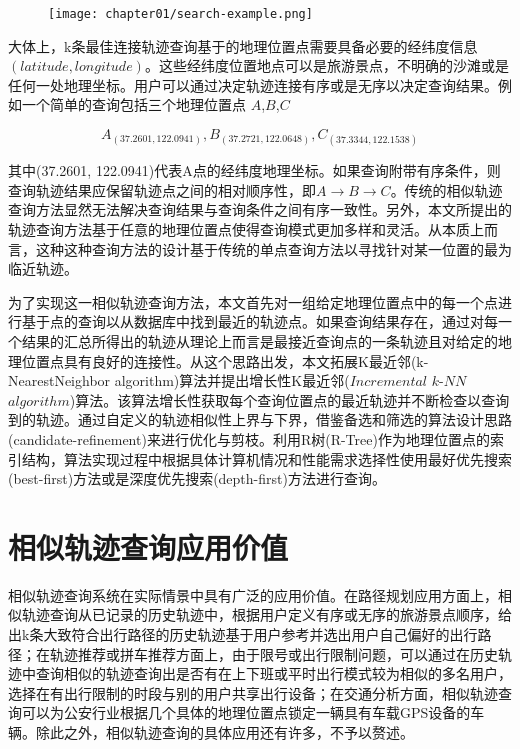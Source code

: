 \begin{figure}[!htp]
  \centering
  \texttt{[image: chapter01/search-example.png]}
\end{figure}

大体上，k条最佳连接轨迹查询基于的地理位置点需要具备必要的经纬度信息$(latitude,longitude)$。这些经纬度位置地点可以是旅游景点，不明确的沙滩或是任何一处地理坐标。用户可以通过决定轨迹连接有序或是无序以决定查询结果。例如一个简单的查询包括三个地理位置点 $A$,$B$,$C$

\begin{displaymath}
	{A_{(37.2601, 122.0941)}, B_{(37.2721, 122.0648)}, C_{(37.3344,122.1538)}}
\end{displaymath}

其中(37.2601, 122.0941)代表A点的经纬度地理坐标。如果查询附带有序条件，则查询轨迹结果应保留轨迹点之间的相对顺序性，即$A \rightarrow B \rightarrow C$。传统的相似轨迹查询方法显然无法解决查询结果与查询条件之间有序一致性。另外，本文所提出的轨迹查询方法基于任意的地理位置点使得查询模式更加多样和灵活。从本质上而言，这种这种查询方法的设计基于传统的单点查询方法以寻找针对某一位置的最为临近轨迹。

为了实现这一相似轨迹查询方法，本文首先对一组给定地理位置点中的每一个点进行基于点的查询以从数据库中找到最近的轨迹点。如果查询结果存在，通过对每一个结果的汇总所得出的轨迹从理论上而言是最接近查询点的一条轨迹且对给定的地理位置点具有良好的连接性。从这个思路出发，本文拓展K最近邻(k-NearestNeighbor algorithm)算法并提出增长性K最近邻($Incremental$ $k$-$NN$ $algorithm$)算法。该算法增长性获取每个查询位置点的最近轨迹并不断检查以查询到的轨迹。通过自定义的轨迹相似性上界与下界，借鉴备选和筛选的算法设计思路(candidate-refinement)来进行优化与剪枝。利用R树(R-Tree)作为地理位置点的索引结构，算法实现过程中根据具体计算机情况和性能需求选择性使用最好优先搜索(best-first)方法或是深度优先搜索(depth-first)方法进行查询。
\\

\section{相似轨迹查询应用价值}
\label{sec:application value}
相似轨迹查询系统在实际情景中具有广泛的应用价值。在路径规划应用方面上，相似轨迹查询从已记录的历史轨迹中，根据用户定义有序或无序的旅游景点顺序，给出k条大致符合出行路径的历史轨迹基于用户参考并选出用户自己偏好的出行路径；在轨迹推荐或拼车推荐方面上，由于限号或出行限制问题，可以通过在历史轨迹中查询相似的轨迹查询出是否有在上下班或平时出行模式较为相似的多名用户，选择在有出行限制的时段与别的用户共享出行设备；在交通分析方面，相似轨迹查询可以为公安行业根据几个具体的地理位置点锁定一辆具有车载GPS设备的车辆。除此之外，相似轨迹查询的具体应用还有许多，不予以赘述。

